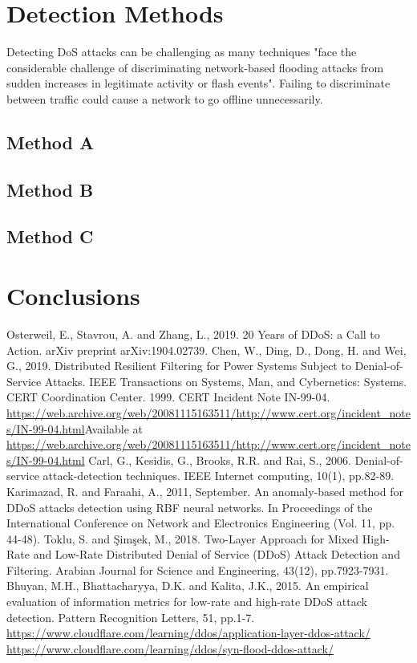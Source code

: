 \documentclass[conference, a4paper]{IEEEtran}
\begin{document}
\section{Detection Methods}
    Detecting DoS attacks can be challenging as many techniques "face the considerable challenge of discriminating network-based flooding attacks from sudden increases in legitimate activity or flash events".\cite{detection_methods_2006}
    Failing to discriminate between traffic could cause a network to go offline unnecessarily.

\subsection{Method A}
\subsection{Method B}
\subsection{Method C}

\section{Conclusions}

\begin{thebibliography}{00}
    Osterweil, E., Stavrou, A. and Zhang, L., 2019. 20 Years of DDoS: a Call to Action. arXiv preprint arXiv:1904.02739.
    Chen, W., Ding, D., Dong, H. and Wei, G., 2019. Distributed Resilient Filtering for Power Systems Subject to Denial-of-Service Attacks. IEEE Transactions on Systems, Man, and Cybernetics: Systems.
    CERT Coordination Center. 1999. CERT Incident Note IN-99-04. \url{https://web.archive.org/web/20081115163511/http://www.cert.org/incident_notes/IN-99-04.html}Available at \url{https://web.archive.org/web/20081115163511/http://www.cert.org/incident_notes/IN-99-04.html}
    Carl, G., Kesidis, G., Brooks, R.R. and Rai, S., 2006. Denial-of-service attack-detection techniques. IEEE Internet computing, 10(1), pp.82-89.
    Karimazad, R. and Faraahi, A., 2011, September. An anomaly-based method for DDoS attacks detection using RBF neural networks. In Proceedings of the International Conference on Network and Electronics Engineering (Vol. 11, pp. 44-48).
    Toklu, S. and Şimşek, M., 2018. Two-Layer Approach for Mixed High-Rate and Low-Rate Distributed Denial of Service (DDoS) Attack Detection and Filtering. Arabian Journal for Science and Engineering, 43(12), pp.7923-7931.
    Bhuyan, M.H., Bhattacharyya, D.K. and Kalita, J.K., 2015. An empirical evaluation of information metrics for low-rate and high-rate DDoS attack detection. Pattern Recognition Letters, 51, pp.1-7.
    \url{https://www.cloudflare.com/learning/ddos/application-layer-ddos-attack/}
    \url{https://www.cloudflare.com/learning/ddos/syn-flood-ddos-attack/}
\end{thebibliography}

\vspace{12pt}
\end{document}
